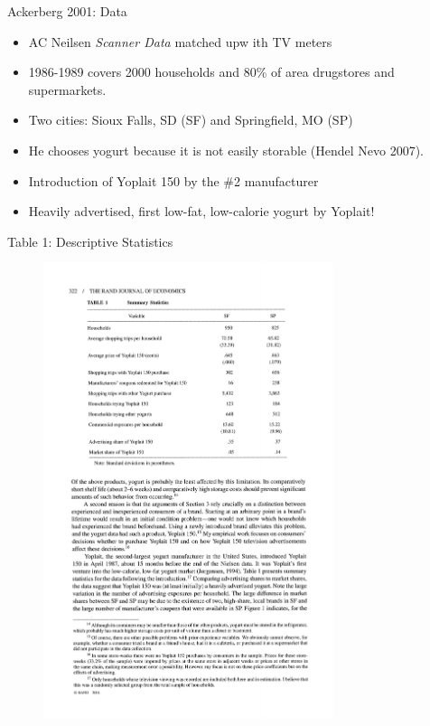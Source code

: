 \documentclass[xcolor=pdftex,dvipsnames,table,mathserif,aspectratio=169]{beamer}
\begin{document}
\begin{frame}{Ackerberg 2001: Data}
\begin{itemize}
\item AC Neilsen \textit{Scanner Data} matched upw ith TV meters
\item 1986-1989 covers 2000 households and 80\% of area drugstores and supermarkets.
\item Two cities: Sioux Falls, SD \alert{(SF)} and Springfield, MO \alert{(SP)}
\item He chooses yogurt because it is not easily storable (Hendel Nevo 2007).
\item Introduction of \alert{Yoplait 150} by the \#2 manufacturer
\item Heavily advertised, first low-fat, low-calorie yogurt by Yoplait!
\end{itemize}
\end{frame}

\begin{frame}{Table 1: Descriptive Statistics}
\begin{figure}[htbp]
\begin{center}
\includegraphics[width=8.5cm]{resources/acker1.pdf}
\label{default}
\end{center}
\end{figure}
\end{frame}
\end{document}
